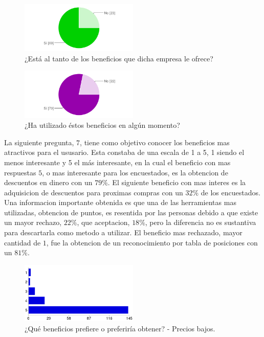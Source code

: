 \begin{figure}[!htb]
  \centering
  \includegraphics[width=0.5\textwidth]{images/chartPreg5.png}
  \caption[chart5]{¿Está al tanto de los beneficios que dicha empresa le ofrece?}
  \label{fig:chart2}
\end{figure}


\begin{figure}[!htb]
  \centering
  \includegraphics[width=0.5\textwidth]{images/chartPreg6.png}
  \caption[chart6]{¿Ha utilizado éstos beneficios en algún momento?}
  \label{fig:chart2}
\end{figure}

La siguiente pregunta, $7$, tiene como objetivo conocer los beneficios mas atractivos para el ususario.
Esta constaba de una escala de 1 a 5, 1 siendo el menos interesante y 5 el más interesante, en la cual
el beneficio con mas respuestas $5$, o mas interesante para los encuestados, es la obtencion de
descuentos en dinero con un $79\%$. El siguiente beneficio con mas interes es la adquisicion de descuentos
para proximas compras con un $32\%$ de los encuestados. Una informacion importante obtenida es que
una de las herramientas mas utilizadas, obtencion de puntos, es resentida por las personas debido a
que existe un mayor rechazo, $22\%$, que aceptacion, $18\%$, pero la diferencia no es sustantiva para
descartarla como metodo a utilizar. El beneficio mas rechazado, mayor cantidad de $1$, fue la
obtencion de un reconocimiento por tabla de posiciones con un $81\%$.

\begin{figure}[!htb]
  \centering
  \includegraphics[width=0.5\textwidth]{images/chartPreg7_1.png}
  \caption[chart7-1]{¿Qué beneficios prefiere o preferiría obtener? - Precios bajos.}
  \label{fig:chart2}
\end{figure}

